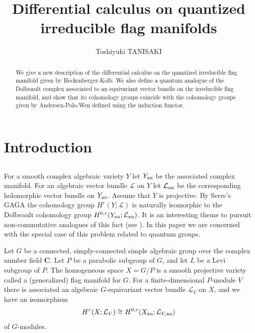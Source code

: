 \documentclass[a4paper, 12pt, leqno]{amsart}
\theoremstyle{definition}
\numberwithin{equation}{section}
\def\BC{{\mathbf{C}}}
\def\CL{{\mathcal L}}
\def\an{{\mathop{\rm an}\nolimits}}
\begin{document}
\title[Differential calculus on quantized irreducible flag manifolds]
{
Differential calculus on quantized irreducible flag manifolds}
\author{Toshiyuki TANISAKI}
\begin{abstract}
We give a new description of the differential calculus on the quantized irreducible flag manifold  given by Heckenberger-Kolb.
We also define a quantum analogue of the Dolbeault complex associated to an equivariant vector bundle on the irreducible flag manifold, and show that its cohomology groups coincide with the cohomology groups given by Andersen-Polo-Wen defined using the induction functor.
\end{abstract}
\maketitle

\section{Introduction}
\subsection{}
For a smooth complex algebraic variety $Y$ let $Y_\an$ be the associated complex manifold.
For an algebraic  vector bundle $\CL$ on $Y$ let $\CL_\an$ be the corresponding holomorphic vector bundle on $Y_\an$.
Assume that $Y$ is projective.
By Serre's GAGA \cite{Se} the cohomology group $H^r(Y;\CL)$ is naturally isomorphic to the Dolbeault cohomology group $H^{0,r}(Y_\an;\CL_\an)$.
It is an interesting theme to pursuit non-commutative analogues of this fact  (see 
\cite{BeS}).
In this paper we are concerned with the special case of this problem related to quantum groups.

Let $G$ be a connected, simply-connected simple algebraic group over the complex number field $\BC$.
Let $P$ be a parabolic subgroup of $G$, and let $L$ be a Levi subgroup of $P$.
The homogeneous space $X=G/P$  is a smooth projective variety called a (generalized) flag manifold for $G$.
For a finite-dimensional $P$-module $V$ there is associated an algebraic $G$-equivariant vector bundle $\CL_V$ on $X$, and 
we have an isomorphism 
\begin{equation}
\label{eq:isom}
H^r(X;\CL_V)\cong H^{0,r}(X_\an;\CL_{V,\an})
\end{equation}
of $G$-modules.
\end{document}
